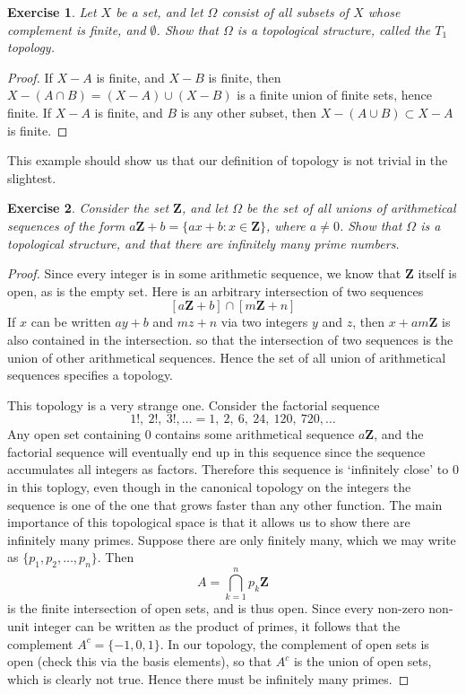 \documentclass{report}
\theoremstyle{plain}
\newtheorem{exercise}{Exercise}[section]
\theoremstyle{definition}
\begin{document}
\begin{exercise}
    Let $X$ be a set, and let $\Omega$ consist of all subsets of $X$ whose complement is finite, and $\emptyset$. Show that $\Omega$ is a topological structure, called the $T_1$ topology.
\end{exercise}
\begin{proof}
    If $X - A$ is finite, and $X - B$ is finite, then $X - (A \cap B) = (X - A) \cup (X - B)$ is a finite union of finite sets, hence finite. If $X - A$ is finite, and $B$ is any other subset, then $X - (A \cup B) \subset X - A$ is finite.
\end{proof}

This example should show us that our definition of topology is not trivial in the slightest.

\begin{exercise}
    Consider the set $\mathbf{Z}$, and let $\Omega$ be the set of all unions of arithmetical sequences of the form $a\mathbf{Z} + b = \{ ax + b: x \in \mathbf{Z}\}$, where $a \neq 0$. Show that $\Omega$ is a topological structure, and that there are infinitely many prime numbers.
\end{exercise}
\begin{proof}
    Since every integer is in some arithmetic sequence, we know that $\mathbf{Z}$ itself is open, as is the empty set. Here is an arbitrary intersection of two sequences
    \[ [a\mathbf{Z} + b] \cap [m\mathbf{Z} + n] \]
    If $x$ can be written $ay + b$ and $mz + n$ via two integers $y$ and $z$, then $x + am\mathbf{Z}$ is also contained in the intersection. so that the intersection of two sequences is the union of other arithmetical sequences. Hence the set of all union of arithmetical sequences specifies a topology.

    This topology is a very strange one. Consider the factorial sequence
    \[ 1!,\ 2!,\ 3!, \dots = 1,\ 2,\ 6,\ 24,\ 120,\ 720, \dots \]
    Any open set containing $0$ contains some arithmetical sequence $a\mathbf{Z}$, and the factorial sequence will eventually end up in this sequence since the sequence accumulates all integers as factors. Therefore this sequence is `infinitely close' to 0 in this toplogy, even though in the canonical topology on the integers the sequence is one of the one that grows faster than any other function. The main importance of this topological space is that it allows us to show there are infinitely many primes. Suppose there are only finitely many, which we may write as $\{ p_1, p_2, \dots, p_n \}$. Then
    \[ A = \bigcap_{k = 1}^n p_k\mathbf{Z} \]
    is the finite intersection of open sets, and is thus open. Since every non-zero non-unit integer can be written as the product of primes, it follows that the complement $A^c = \{ -1,0,1 \}$. In our topology, the complement of open sets is open (check this via the basis elements), so that $A^c$ is the union of open sets, which is clearly not true. Hence there must be infinitely many primes.
\end{proof}
\end{document}
